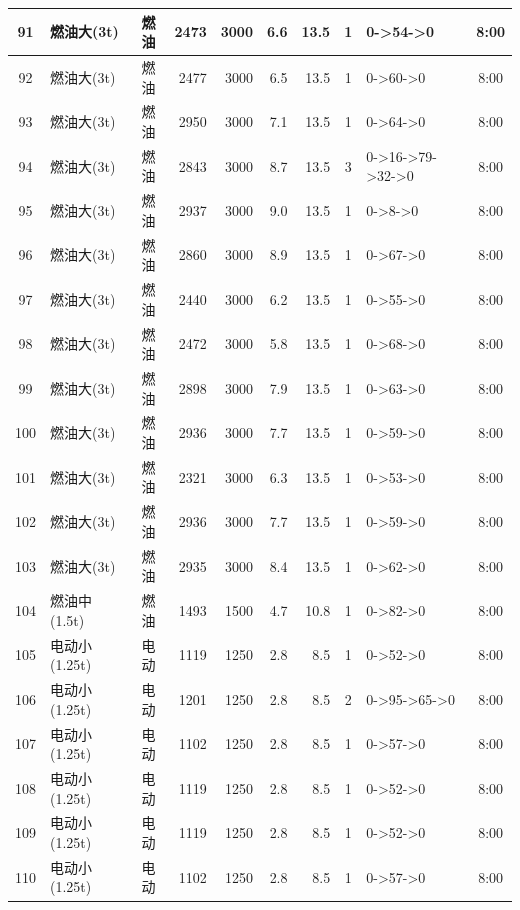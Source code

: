 \begin{landscape}
\begin{longtable}{|c|l|c|r|r|r|r|c|p{2.8cm}|c|}
\hline
\rowcolor{gray!8}
91 & 燃油大(3t) & 燃油 & 2473 & 3000 & 6.6 & 13.5 & 1 & 0->54->0 & 8:00 \\
\hline
92 & 燃油大(3t) & 燃油 & 2477 & 3000 & 6.5 & 13.5 & 1 & 0->60->0 & 8:00 \\
\hline
\rowcolor{gray!8}
93 & 燃油大(3t) & 燃油 & 2950 & 3000 & 7.1 & 13.5 & 1 & 0->64->0 & 8:00 \\
\hline
94 & 燃油大(3t) & 燃油 & 2843 & 3000 & 8.7 & 13.5 & 3 & 0->16->79->32->0 & 8:00 \\
\hline
\rowcolor{gray!8}
95 & 燃油大(3t) & 燃油 & 2937 & 3000 & 9.0 & 13.5 & 1 & 0->8->0 & 8:00 \\
\hline
96 & 燃油大(3t) & 燃油 & 2860 & 3000 & 8.9 & 13.5 & 1 & 0->67->0 & 8:00 \\
\hline
\rowcolor{gray!8}
97 & 燃油大(3t) & 燃油 & 2440 & 3000 & 6.2 & 13.5 & 1 & 0->55->0 & 8:00 \\
\hline
98 & 燃油大(3t) & 燃油 & 2472 & 3000 & 5.8 & 13.5 & 1 & 0->68->0 & 8:00 \\
\hline
\rowcolor{gray!8}
99 & 燃油大(3t) & 燃油 & 2898 & 3000 & 7.9 & 13.5 & 1 & 0->63->0 & 8:00 \\
\hline
100 & 燃油大(3t) & 燃油 & 2936 & 3000 & 7.7 & 13.5 & 1 & 0->59->0 & 8:00 \\
\hline
\rowcolor{gray!8}
101 & 燃油大(3t) & 燃油 & 2321 & 3000 & 6.3 & 13.5 & 1 & 0->53->0 & 8:00 \\
\hline
102 & 燃油大(3t) & 燃油 & 2936 & 3000 & 7.7 & 13.5 & 1 & 0->59->0 & 8:00 \\
\hline
\rowcolor{gray!8}
103 & 燃油大(3t) & 燃油 & 2935 & 3000 & 8.4 & 13.5 & 1 & 0->62->0 & 8:00 \\
\hline
104 & 燃油中(1.5t) & 燃油 & 1493 & 1500 & 4.7 & 10.8 & 1 & 0->82->0 & 8:00 \\
\hline
\rowcolor{gray!8}
105 & 电动小(1.25t) & 电动 & 1119 & 1250 & 2.8 & 8.5 & 1 & 0->52->0 & 8:00 \\
\hline
106 & 电动小(1.25t) & 电动 & 1201 & 1250 & 2.8 & 8.5 & 2 & 0->95->65->0 & 8:00 \\
\hline
\rowcolor{gray!8}
107 & 电动小(1.25t) & 电动 & 1102 & 1250 & 2.8 & 8.5 & 1 & 0->57->0 & 8:00 \\
\hline
108 & 电动小(1.25t) & 电动 & 1119 & 1250 & 2.8 & 8.5 & 1 & 0->52->0 & 8:00 \\
\hline
\rowcolor{gray!8}
109 & 电动小(1.25t) & 电动 & 1119 & 1250 & 2.8 & 8.5 & 1 & 0->52->0 & 8:00 \\
\hline
110 & 电动小(1.25t) & 电动 & 1102 & 1250 & 2.8 & 8.5 & 1 & 0->57->0 & 8:00 \\

\end{longtable}
\end{landscape}

